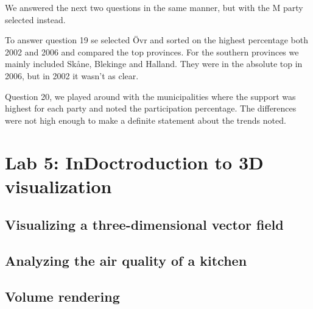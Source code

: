 \documentclass[a4paper]{article}
\begin{document}
We answered the next two questions in the same manner, but with the M party selected instead.

To answer question 19 se selected \"Ovr and sorted on the highest percentage both 2002 and 2006 and compared the top provinces. For the southern provinces we mainly included Sk\aa ne, Blekinge and Halland. They were in the absolute top in 2006, but in 2002 it wasn't as clear. 

Question 20, we played around with the municipalities where the support was highest for each party and noted the participation percentage. The differences were not high enough to make a definite statement about the trends noted.

\section{Lab 5: InDoctroduction to 3D visualization}

\subsection{Visualizing a three-dimensional vector field}

\subsection{Analyzing the air quality of a kitchen}

\subsection{Volume rendering}
\end{document}
